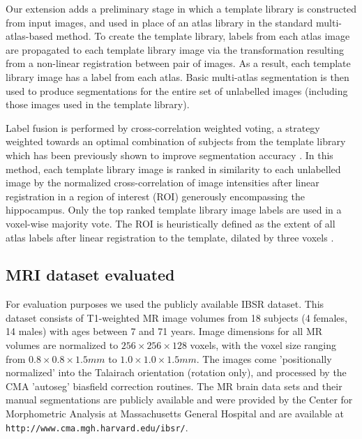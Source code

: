 \documentclass{article}\usepackage[]{graphicx}\usepackage[]{color}
\begin{document}
Our extension adds a preliminary stage in which a template library is
constructed from input images, and used in place of an atlas library in the
standard multi-atlas-based method.  To create the template library, labels from
each atlas image are propagated to each template library image via the
transformation resulting from a non-linear registration between pair of images.
As a result, each template library image has a label from each atlas.
Basic multi-atlas segmentation is then used to produce segmentations for the
entire set of unlabelled images (including those images used in the template
library). 

Label fusion is performed by cross-correlation weighted voting, a strategy
weighted towards an optimal combination of subjects from the template library
which has been previously shown to improve segmentation
accuracy \citep{Aljabar2009,Collins2010}. In this method, each template library
image is ranked in similarity to each unlabelled image by the normalized
cross-correlation of image intensities after linear registration in a region of
interest (ROI) generously encompassing the hippocampus.  Only the top ranked
template library image labels are used in a voxel-wise majority vote. The ROI
is heuristically defined as the extent of all atlas labels after linear
registration to the template, dilated by three voxels \citep{Chakravarty2012}.

\subsection{MRI dataset evaluated}

For evaluation purposes we used the publicly available IBSR dataset.  This
dataset consists of T1-weighted MR image volumes from 18 subjects (4 females,
14 males) with ages between 7 and 71 years. Image dimensions for all MR volumes
are normalized to  $256  \times 256 \times 128$ voxels, with the voxel size
ranging from $0.8 \times 0.8 \times 1.5 mm$ to $1.0 \times 1.0 \times 1.5 mm$.
The images come 'positionally normalized' into the Talairach orientation
(rotation only), and processed by the CMA 'autoseg' biasfield correction
routines. The MR brain data sets and their manual segmentations are publicly
available and were provided by the Center for Morphometric Analysis at
Massachusetts General Hospital and are available at
{\tt http://www.cma.mgh.harvard.edu/ibsr/}.
\end{document}
